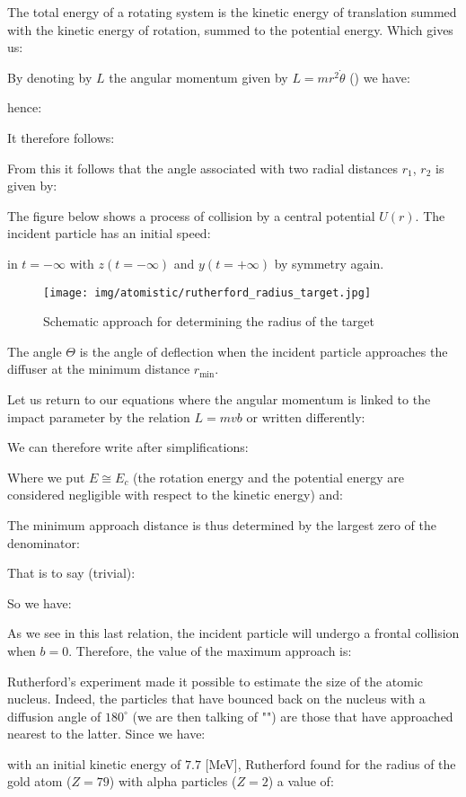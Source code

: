 	The total energy of a rotating system is the kinetic energy of translation summed with the kinetic energy of rotation, summed to the potential energy. Which gives us:
	
	By denoting by $L$ the angular momentum given by $L=mr^2\dot{\theta}$ () we have:
	
	hence:
	
	It therefore follows:
	
	From this it follows that the angle associated with two radial distances $r_1$, $r_2$ is given by:
	
	The figure below shows a process of collision by a central potential $U(r)$. The incident particle has an initial speed:
	
	in $t=-\infty$ with $z(t=-\infty)$ and $y(t=+\infty)$ by symmetry again.
	\begin{figure}[H]
		\centering
		\texttt{[image: img/atomistic/rutherford\_radius\_target.jpg]}
		\caption[]{Schematic approach for determining the radius of the target}
	\end{figure}
	The angle $\Theta$ is the angle of deflection when the incident particle approaches the diffuser at the minimum distance $r_{\min}.$

	Let us return to our equations where the angular momentum is linked to the impact parameter by the relation $L=mvb$ or written differently:
	
	We can therefore write after simplifications:
	
	Where we put $E\cong E_c$ (the rotation energy and the potential energy are considered negligible with respect to the kinetic energy) and:
	
	The minimum approach distance is thus determined by the largest zero of the denominator:
	
	That is to say (trivial):
	
	So we have:
	
	As we see in this last relation, the incident particle will undergo a frontal collision when $b=0$. Therefore, the value of the maximum approach is:
	
	Rutherford's experiment made it possible to estimate the size of the atomic nucleus. Indeed, the particles that have bounced back on the nucleus with a diffusion angle of $180^\circ$ (we are then talking of "") are those that have approached nearest to the latter. Since we have:
	
	with an initial kinetic energy of $7.7$ [MeV], Rutherford found for the radius of the gold atom ($Z = 79$) with alpha particles ($Z = 2$) a value of:
	
